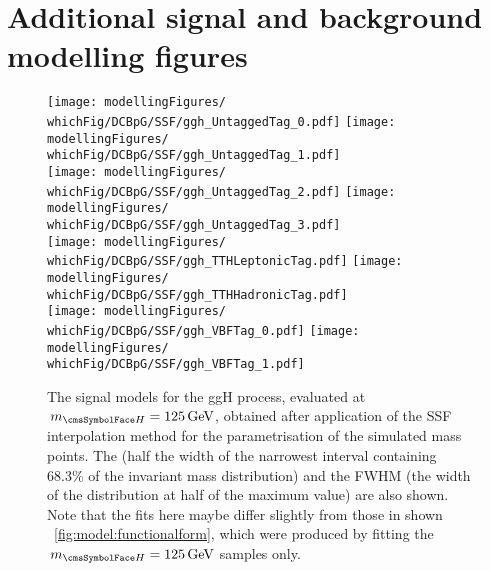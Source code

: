 \chapter{Additional signal and background modelling figures}
\label{app:modelling}

\ifNewAnalysis
\else
\begin{figure}[htp!]
\centering
\texttt{[image: modellingFigures/\\whichFig/DCBpG/SSF/ggh\_UntaggedTag\_0.pdf]} 
\texttt{[image: modellingFigures/\\whichFig/DCBpG/SSF/ggh\_UntaggedTag\_1.pdf]} \\
\texttt{[image: modellingFigures/\\whichFig/DCBpG/SSF/ggh\_UntaggedTag\_2.pdf]} 
\texttt{[image: modellingFigures/\\whichFig/DCBpG/SSF/ggh\_UntaggedTag\_3.pdf]} \\ 
\texttt{[image: modellingFigures/\\whichFig/DCBpG/SSF/ggh\_TTHLeptonicTag.pdf]} 
\texttt{[image: modellingFigures/\\whichFig/DCBpG/SSF/ggh\_TTHHadronicTag.pdf]} \\ 
\texttt{[image: modellingFigures/\\whichFig/DCBpG/SSF/ggh\_VBFTag\_0.pdf]} 
\texttt{[image: modellingFigures/\\whichFig/DCBpG/SSF/ggh\_VBFTag\_1.pdf]} \\

\caption{The signal models for the ggH process, evaluated at $\mH=125\GeV$, obtained after application of the SSF interpolation method for the \DCBpG parametrisation of the simulated mass points. The \effSigma (half the width of the narrowest interval containing 68.3\% of the invariant mass distribution) and the FWHM (the width of the distribution at half of the maximum value) are also shown. Note that the fits here maybe differ slightly from those in shown \Fig~\ref{fig:model:functionalform}, which were produced by fitting the $\mH=125\GeV$ samples only.}

\label{fig:model:sig_model_per_ggh}
\end{figure}

